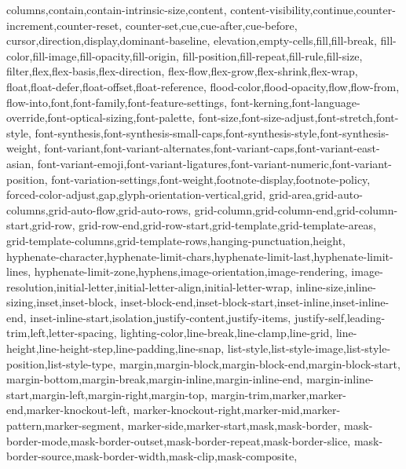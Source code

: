 {{      columns,contain,contain-intrinsic-size,content,
      content-visibility,continue,counter-increment,counter-reset,
      counter-set,cue,cue-after,cue-before,
      cursor,direction,display,dominant-baseline,
      elevation,empty-cells,fill,fill-break,
      fill-color,fill-image,fill-opacity,fill-origin,
      fill-position,fill-repeat,fill-rule,fill-size,
      filter,flex,flex-basis,flex-direction,
      flex-flow,flex-grow,flex-shrink,flex-wrap,
      float,float-defer,float-offset,float-reference,
      flood-color,flood-opacity,flow,flow-from,
      flow-into,font,font-family,font-feature-settings,
      font-kerning,font-language-override,font-optical-sizing,font-palette,
      font-size,font-size-adjust,font-stretch,font-style,
      font-synthesis,font-synthesis-small-caps,font-synthesis-style,font-synthesis-weight,
      font-variant,font-variant-alternates,font-variant-caps,font-variant-east-asian,
      font-variant-emoji,font-variant-ligatures,font-variant-numeric,font-variant-position,
      font-variation-settings,font-weight,footnote-display,footnote-policy,
      forced-color-adjust,gap,glyph-orientation-vertical,grid,
      grid-area,grid-auto-columns,grid-auto-flow,grid-auto-rows,
      grid-column,grid-column-end,grid-column-start,grid-row,
      grid-row-end,grid-row-start,grid-template,grid-template-areas,
      grid-template-columns,grid-template-rows,hanging-punctuation,height,
      hyphenate-character,hyphenate-limit-chars,hyphenate-limit-last,hyphenate-limit-lines,
      hyphenate-limit-zone,hyphens,image-orientation,image-rendering,
      image-resolution,initial-letter,initial-letter-align,initial-letter-wrap,
      inline-size,inline-sizing,inset,inset-block,
      inset-block-end,inset-block-start,inset-inline,inset-inline-end,
      inset-inline-start,isolation,justify-content,justify-items,
      justify-self,leading-trim,left,letter-spacing,
      lighting-color,line-break,line-clamp,line-grid,
      line-height,line-height-step,line-padding,line-snap,
      list-style,list-style-image,list-style-position,list-style-type,
      margin,margin-block,margin-block-end,margin-block-start,
      margin-bottom,margin-break,margin-inline,margin-inline-end,
      margin-inline-start,margin-left,margin-right,margin-top,
      margin-trim,marker,marker-end,marker-knockout-left,
      marker-knockout-right,marker-mid,marker-pattern,marker-segment,
      marker-side,marker-start,mask,mask-border,
      mask-border-mode,mask-border-outset,mask-border-repeat,mask-border-slice,
      mask-border-source,mask-border-width,mask-clip,mask-composite,
}}
